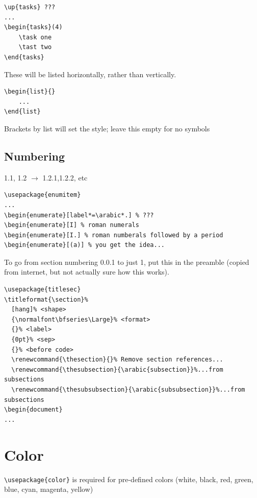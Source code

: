 \documentclass{article}
\begin{document}
\begin{verbatim}
\up{tasks} ???
...
\begin{tasks}(4)
    \task one
    \tast two
\end{tasks}
\end{verbatim}
These will be listed horizontally, rather than vertically.

\begin{verbatim}
\begin{list}{}
    ...
\end{list}
\end{verbatim}
Brackets by list will set the style; leave this empty for no symbols


\subsection{Numbering}
1.1, 1.2 $\rightarrow$ 1.2.1,1.2.2, etc
\begin{verbatim}
\usepackage{enumitem}
...
\begin{enumerate}[label*=\arabic*.] % ???
\begin{enumerate}[I] % roman numerals
\begin{enumerate}[I.] % roman numberals followed by a period
\begin{enumerate}[(a)] % you get the idea...
\end{verbatim}

To go from section numbering 0.0.1 to just 1,
put this in the preamble
(copied from internet, but not actually sure how this works).
\begin{verbatim}
\usepackage{titlesec}
\titleformat{\section}%
  [hang]% <shape>
  {\normalfont\bfseries\Large}% <format>
  {}% <label>
  {0pt}% <sep>
  {}% <before code>
  \renewcommand{\thesection}{}% Remove section references...
  \renewcommand{\thesubsection}{\arabic{subsection}}%...from subsections
  \renewcommand{\thesubsubsection}{\arabic{subsubsection}}%...from subsections
\begin{document}
...
\end{verbatim}

\section{Color}\label{color}

\verb|\usepackage{color}| is required for
pre-defined colors (white, black, red, green, blue, cyan, magenta, yellow)
\end{document}
